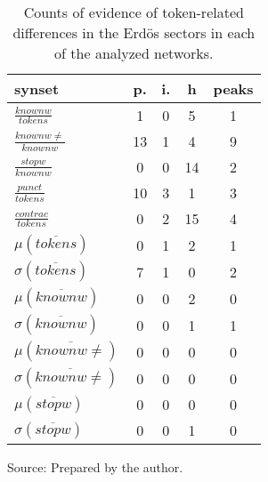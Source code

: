 \begin{table}[h!]
\begin{center}
\caption{Counts of evidence of token-related differences in the Erd\"os sectors in each of the analyzed networks.}
	\def\arraystretch{1.5}
\begin{tabular}{| l || c | c | c || c |}\hline
{\bf synset} & {\bf p.} & {\bf i.} & {\bf h} & {\bf peaks} \\\hline\hline
$\frac{knownw}{tokens}$ & 1  & 0  & 5  & 1 \\
$\frac{knownw \neq}{knownw}$ & 13  & 1  & 4  & 9 \\
$\frac{stopw}{knownw}$ & 0  & 0  & 14  & 2 \\
$\frac{punct}{tokens}$ & 10  & 3  & 1  & 3 \\
$\frac{contrac}{tokens}$ & 0  & 2  & 15  & 4 \\\hline
$\mu(\overline{tokens})$ & 0  & 1  & 2  & 1 \\
$\sigma(\overline{tokens})$ & 7  & 1  & 0  & 2 \\\hline
$\mu(\overline{knownw})$ & 0  & 0  & 2  & 0 \\
$\sigma(\overline{knownw})$ & 0  & 0  & 1  & 1 \\\hline
$\mu(\overline{knownw \neq})$ & 0  & 0  & 0  & 0 \\
$\sigma(\overline{knownw \neq})$ & 0  & 0  & 0  & 0 \\\hline
$\mu(\overline{stopw})$ & 0  & 0  & 0  & 0 \\
$\sigma(\overline{stopw})$ & 0  & 0  & 1  & 0 \\\hline
\end{tabular}
\begin{flushleft}
		Source: Prepared by the author.\
\end{flushleft}
\end{center}
\end{table}
